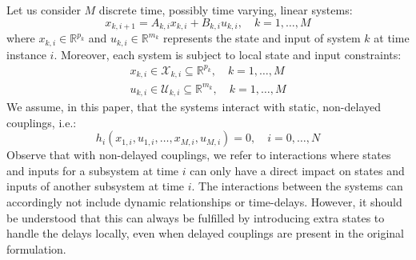 Let us consider $M$ discrete time, possibly time varying, linear systems:
\begin{equation} \label{e:SystemDynamics}
x_{k,i+1} = A_{k,i} x_{k,i} + B_{k,i} u_{k,i}, \quad k = 1, \dots, M
\end{equation}
where $x_{k,i} \in \mathbb{R}^{p_{k}}$ and $u_{k,i} \in \mathbb{R}^{m_{k}}$ represents the state and input of system $k$ at time instance $i$. Moreover, each system is subject to local state and input constraints:
\begin{subequations} \label{e:StateInputConstraints}
\begin{align}
x_{k,i} \in \mathcal{X}_{k,i} \subseteq \mathbb{R}^{p_{k}}, \quad k = 1, \dots, M \\
u_{k,i} \in \mathcal{U}_{k,i} \subseteq \mathbb{R}^{m_{k}}, \quad k = 1, \dots, M
\end{align}
\end{subequations}
We assume, in this paper, that the systems interact with static, non-delayed couplings, i.e.:
\begin{equation} \label{e:MPCcouplings}
h_i(x_{1,i}, u_{1,i}, \dots, x_{M,i}, u_{M,i}) = 0, \quad i = 0,\dots,N
\end{equation}
Observe that with non-delayed couplings, we refer to interactions where states and inputs for a subsystem at time $i$ can only have a direct impact on states and inputs of another subsystem at time $i$. The interactions between the systems can accordingly not include dynamic relationships or time-delays. However, it should be understood that this can always be fulfilled by introducing extra states to handle the delays locally, even when delayed couplings are present in the original formulation.

